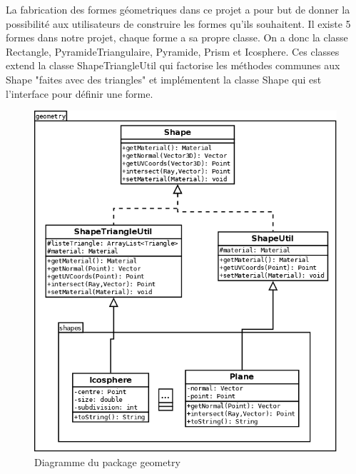 \documentclass[12pt]{article}
\begin{document}
La fabrication des formes géometriques dans ce projet a pour but de donner la possibilité aux utilisateurs de construire les formes qu'ils souhaitent.
Il existe 5 formes dans notre projet, chaque forme a sa propre classe. On a donc la classe Rectangle, PyramideTriangulaire, Pyramide, Prism et Icosphere.
Ces classes extend la classe ShapeTriangleUtil qui factorise les méthodes communes aux Shape "faites avec des triangles"  et  implémentent la classe Shape qui est l'interface pour définir une forme.

\begin{figure}[ht]
\begin{center}
\includegraphics[width = 0.8 \textwidth]{diagrammes/package_geometry.png}
\caption{Diagramme du package geometry}
\end{center}
\end{figure}
\end{document}
